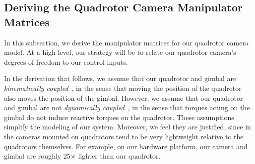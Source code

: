 % 







\subsection{Deriving the Quadrotor Camera Manipulator Matrices}
\label{sec:ch2:manipulator_detail}

In this subsection, we derive the manipulator matrices for our quadrotor camera model.
At a high level, our strategy will be to relate our quadrotor camera's degrees of freedom to our control inputs.

In the derivation that follows, we assume that our quadrotor and gimbal are \emph{kinematically coupled}~\cite{kondak:2013}, in the sense that moving the position of the quadrotor also moves the position of the gimbal. However, we assume that our quadrotor and gimbal are not \emph{dynamically coupled}~\cite{kondak:2013}, in the sense that torques acting on the gimbal do not induce reactive torques on the quadrotor.
These assumptions simplify the modeling of our system. Moreover, we feel they are justified, since in the cameras mounted on quadrotors tend to be very lightweight relative to the quadrotors themselves. For example, on our hardware platform, our camera and gimbal are roughly 25$\times$ lighter than our quadrotor.

